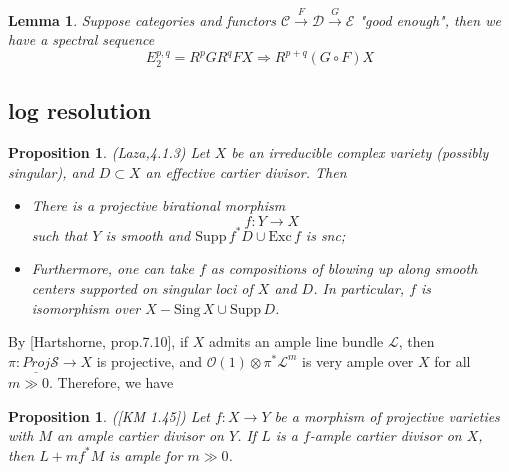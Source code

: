 \documentclass{article}
\newtheorem{prop}[defn]{Proposition}
\newtheorem{lem}[defn]{Lemma}
\begin{document}
\begin{lem}
  Suppose categories and functors $ \mathscr{C}\xrightarrow{F}\mathscr{D}\xrightarrow{G}\mathscr{E} $ "good enough", then we have a spectral sequence
  \[ E_2^{p,q}=R^pGR^qFX\Rightarrow R^{p+q}(G\circ F)X \]
\end{lem}
\subsection{log resolution}
\begin{prop}
  (Laza,4.1.3) Let $ X $ be an irreducible complex variety (possibly singular), and $ D\subset X $ an effective cartier divisor. Then 
  \begin{itemize}
    \item There is a projective birational morphism 
    \[ f:Y\to X \]
    such that $ Y $ is smooth and $ \mathrm{Supp}\,f^*D\cup\mathrm{Exc}\,f $ is snc;
    \item Furthermore, one can take $ f $ as compositions of blowing up along smooth centers supported on singular loci of $ X $ and $ D $. In particular, $ f $ is isomorphism over $ X-\mathrm{Sing}\, X\cup \mathrm{Supp}\,D $.  
  \end{itemize}
\end{prop}
By [Hartshorne, prop.7.10],  if $ X $ admits an ample line bundle $ \mathcal{L} $, then  $\pi: \underline{Proj}\mathcal{S}\to X $ is projective, and $ \mathcal{O}(1)\otimes \pi^*\mathcal{L}^m $ is very ample over $ X $  for all $ m\gg 0 $. Therefore, we have 
\begin{prop}
  ([KM 1.45]) Let $ f:X\to Y $ be a morphism of projective varieties with $ M $ an ample cartier divisor on $ Y $. If $ L $ is a $ f $-ample cartier divisor on $ X $, then $ L+mf^*M $ is ample for $ m\gg 0 $. 
\end{prop}
\end{document}
